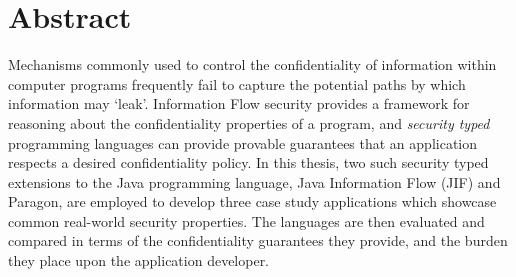
\chapter{Abstract}

Mechanisms commonly used to control the confidentiality of information within computer programs frequently fail to capture the potential paths by which information may `leak'. Information Flow security provides a framework for reasoning about the confidentiality properties of a program, and \textit{security typed} programming languages can provide provable guarantees that an application respects a desired confidentiality policy. In this thesis, two such security typed extensions to the Java programming language, Java Information Flow (JIF) and Paragon, are employed to develop three case study applications which showcase common real-world security properties. The languages are then evaluated and compared in terms of the confidentiality guarantees they provide, and the burden they place upon the application developer.